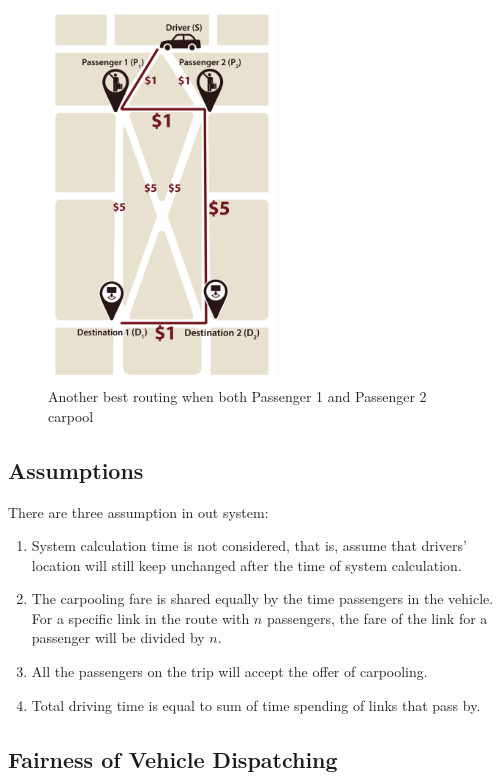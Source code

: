 \begin{figure}[htp]
  \centering
  \captionsetup{justification=centering}
  \includegraphics[width=6cm]{figures/mapV2_3.jpg}
  \caption{Another best routing when both Passenger 1 and Passenger 2 carpool}
\end{figure}
\newpage

\subsection{Assumptions}

There are three assumption in out system:

\begin{enumerate}
  \item System calculation time is not considered, that is, assume that drivers' location will still keep unchanged after the time of system calculation.
  \item The carpooling fare is shared equally by the time passengers in the vehicle. For a specific link in the route with $n$ passengers, the fare of the link for a passenger will be divided by $n$.
  \item All the passengers on the trip will accept the offer of carpooling.
  \item Total driving time is equal to sum of time spending of links that pass by.
 \end{enumerate}

\subsection{Fairness of Vehicle Dispatching}

